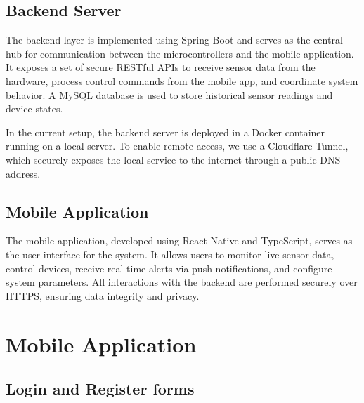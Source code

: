 \documentclass[11pt,a4paper]{article}
\begin{document}
\subsection{Backend Server}

The backend layer is implemented using Spring Boot and serves as the central hub for communication between the microcontrollers and the mobile application. It exposes a set of secure RESTful APIs to receive sensor data from the hardware, process control commands from the mobile app, and coordinate system behavior. A MySQL database is used to store historical sensor readings and device states.

In the current setup, the backend server is deployed in a Docker container running on a local server. To enable remote access, we use a Cloudflare Tunnel, which securely exposes the local service to the internet through a public DNS address.

\subsection{Mobile Application}

The mobile application, developed using React Native and TypeScript, serves as the user interface for the system. It allows users to monitor live sensor data, control devices, receive real-time alerts via push notifications, and configure system parameters. All interactions with the backend are performed securely over HTTPS, ensuring data integrity and privacy.

\section{Mobile Application}

\subsection{Login and Register forms}
\end{document}
